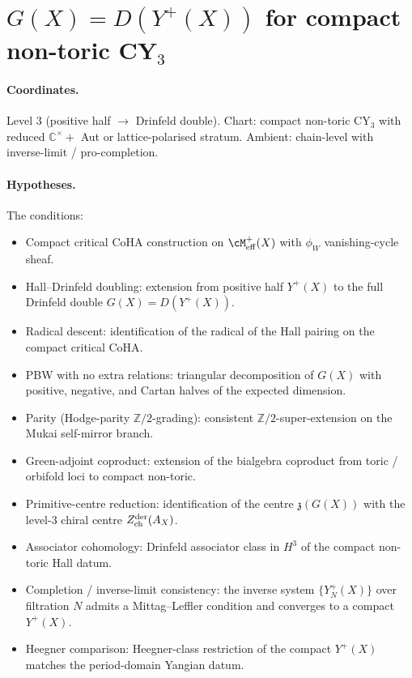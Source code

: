 \section{$G(X) = D(Y^+(X))$ for compact non-toric CY$_3$}
\label{sec:open-Gx-compact}

\paragraph{Coordinates.} Level 3 (positive half $\to$ Drinfeld double).
Chart: compact non-toric CY$_3$ with reduced $\mathbb{C}^\times +$ Aut
or lattice-polarised stratum. Ambient: chain-level with
inverse-limit / pro-completion.

\paragraph{Hypotheses.} The conditions:
\begin{itemize}[nosep]
\item Compact critical CoHA construction on $\cM^+_{\mathrm{eff}}(X)$
  with $\phi_W$ vanishing-cycle sheaf.
\item Hall--Drinfeld doubling: extension from positive half $Y^+(X)$ to
  the full Drinfeld double $G(X) = D(Y^+(X))$.
\item Radical descent: identification of the radical of the Hall pairing
  on the compact critical CoHA.
\item PBW with no extra relations: triangular decomposition of $G(X)$
  with positive, negative, and Cartan halves of the expected dimension.
\item Parity (Hodge-parity $\mathbb{Z}/2$-grading): consistent
  $\mathbb{Z}/2$-super-extension on the Mukai self-mirror branch.
\item Green-adjoint coproduct: extension of the bialgebra coproduct
  from toric / orbifold loci to compact non-toric.
\item Primitive-centre reduction: identification of the centre
  $\mathfrak{z}(G(X))$ with the level-3 chiral centre $Z^{\mathrm{der}}_{\mathrm{ch}}(A_X)$.
\item Associator cohomology: Drinfeld associator class in $H^3$ of the
  compact non-toric Hall datum.
\item Completion / inverse-limit consistency: the inverse system
  $\{Y^+_N(X)\}$ over filtration $N$ admits a Mittag--Leffler condition
  and converges to a compact $Y^+(X)$.
\item Heegner comparison: Heegner-class restriction of the compact
  $Y^+(X)$ matches the period-domain Yangian datum.
\end{itemize}

